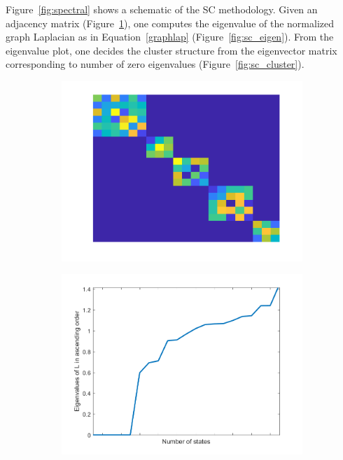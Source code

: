 Figure~\ref{fig:spectral} shows a schematic of the SC methodology. Given an adjacency matrix (Figure~\ref{fig:sc_adjacency}), one computes the eigenvalue of the normalized graph Laplacian as in Equation~\ref{graphlap} (Figure~\ref{fig:sc_eigen}). From the eigenvalue plot, one decides the cluster structure from the eigenvector matrix corresponding to number of zero eigenvalues (Figure~\ref{fig:sc_cluster}).

\begin{figure}[H]
\centering
\begin{subfigure}{0.32\textwidth}
\centering
\includegraphics[width=\textwidth]{figures/adjacency}
\caption{}
\label{fig:sc_adjacency}
\end{subfigure}
\begin{subfigure}{0.32\textwidth}
\centering
\includegraphics[width=\textwidth]{figures/eig}

\end{subfigure}
\end{figure}
